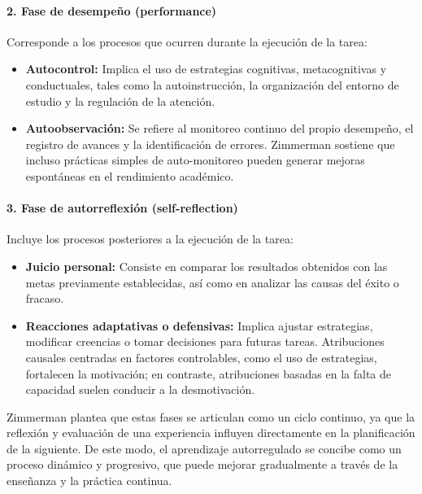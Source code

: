 \paragraph{2. Fase de desempeño (performance)}

Corresponde a los procesos que ocurren durante la ejecución de la tarea:

\begin{itemize}
    \item \textbf{Autocontrol:} Implica el uso de estrategias cognitivas, metacognitivas y conductuales, tales como la autoinstrucción, la organización del entorno de estudio y la regulación de la atención.
    
    \item \textbf{Autoobservación:} Se refiere al monitoreo continuo del propio desempeño, el registro de avances y la identificación de errores. Zimmerman sostiene que incluso prácticas simples de auto-monitoreo pueden generar mejoras espontáneas en el rendimiento académico.
\end{itemize}

\paragraph{3. Fase de autorreflexión (self-reflection)}

Incluye los procesos posteriores a la ejecución de la tarea:

\begin{itemize}
    \item \textbf{Juicio personal:} Consiste en comparar los resultados obtenidos con las metas previamente establecidas, así como en analizar las causas del éxito o fracaso.
    
    \item \textbf{Reacciones adaptativas o defensivas:} Implica ajustar estrategias, modificar creencias o tomar decisiones para futuras tareas. Atribuciones causales centradas en factores controlables, como el uso de estrategias, fortalecen la motivación; en contraste, atribuciones basadas en la falta de capacidad suelen conducir a la desmotivación.
\end{itemize}

Zimmerman plantea que estas fases se articulan como un ciclo continuo, ya que la reflexión y evaluación de una experiencia influyen directamente en la planificación de la siguiente. De este modo, el aprendizaje autorregulado se concibe como un proceso dinámico y progresivo, que puede mejorar gradualmente a través de la enseñanza y la práctica continua.

